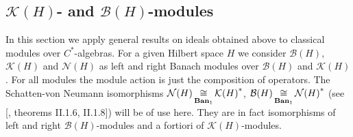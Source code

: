 
\subsection{
    \texorpdfstring{$\mathcal{K}(H)$}{K(H)}- and
    \texorpdfstring{$\mathcal{B}(H)$}{B(H)}-modules}\label{
SubSectionKHAndBHModules}

In this section we apply general results on ideals obtained above to classical
modules over $C^*$-algebras.  For a given Hilbert space $H$ we consider
$\mathcal{B}(H)$, $\mathcal{K}(H)$ and $\mathcal{N}(H)$ as left and right Banach
modules over $\mathcal{B}(H)$ and $\mathcal{K}(H)$. For all modules the module
action is just the composition of operators. The Schatten-von Neumann
isomorphisms $\mathcal{N}(H)\mathop{\mathbin{\cong}}\limits_{\mathbf{Ban}_1}{\mathcal{K}(H)}^*$,
$\mathcal{B}(H)\mathop{\mathbin{\cong}}\limits_{\mathbf{Ban}_1}{\mathcal{N}(H)}^*$ (see
[\cite{TakThOpAlgVol1}, theorems II.1.6, II.1.8]) will be of use here. They are
in fact isomorphisms of left and right $\mathcal{B}(H)$-modules and a fortiori
of $\mathcal{K}(H)$-modules.

